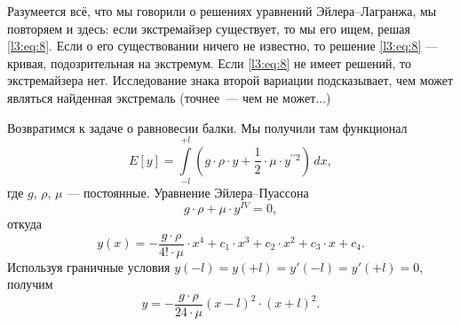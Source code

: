 Разумеется всё, что мы говорили о решениях уравнений Эйлера--Лагранжа, мы повторяем и здесь: если экстремайзер существует, то мы его ищем, решая \eqref{l3:eq:8}. Если о его существовании ничего не известно, то решение \eqref{l3:eq:8} --- кривая, подозрительная на экстремум. Если \eqref{l3:eq:8} не имеет решений, то экстремайзера нет. Исследование знака второй вариации подсказывает, чем может являться найденная экстремаль (точнее~--- чем не может{\mb...})

Возвратимся к задаче о равновесии балки. Мы получили там функционал 
\begin{equation*}
	 E[y]=\int\limits_{-l}^{+l}\left(g\cdot\rho\cdot y+\frac12\cdot\mu\cdot y^{\prime\prime2}\right)\,dx,
\end{equation*}
где $g$, $\rho$, $\mu$ --- постоянные.
Уравнение Эйлера--Пуассона 
\begin{equation*}
	 g\cdot\rho+\mu\cdot y^{IV}=0,
\end{equation*}
откуда
\begin{equation*}
	 y(x)=-\frac{g\cdot\rho}{4!\cdot\mu}\cdot x^4+c_1\cdot x^3+c_2\cdot x^2+c_3\cdot x+c_4.
\end{equation*}
Используя граничные условия $y(-l)=y(+l)=y'(-l)=y'(+l)=0${\mb,} получим
\begin{equation*}
	 y=-\frac{g\cdot\rho}{24\cdot\mu}(x-l)^2\cdot(x+l)^2.
\end{equation*} 

